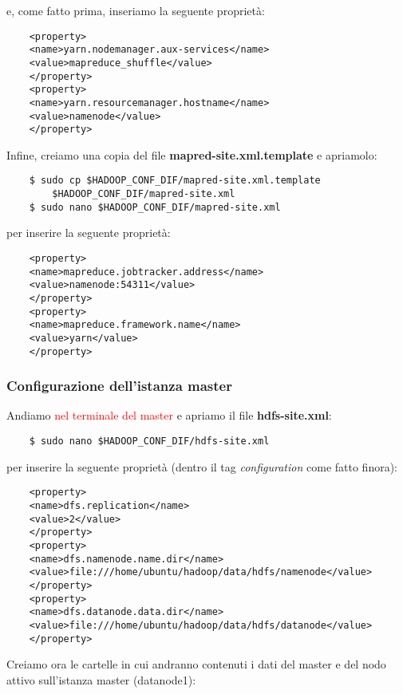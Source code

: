 e, come fatto prima, inseriamo la seguente proprietà:

\begin{verbatim}
    <property>
    <name>yarn.nodemanager.aux-services</name>
    <value>mapreduce_shuffle</value>
    </property>
    <property>
    <name>yarn.resourcemanager.hostname</name>
    <value>namenode</value>
    </property>
\end{verbatim}

Infine, creiamo una copia del file \textbf{mapred-site.xml.template} e apriamolo:

\begin{verbatim}
    $ sudo cp $HADOOP_CONF_DIF/mapred-site.xml.template
        $HADOOP_CONF_DIF/mapred-site.xml
    $ sudo nano $HADOOP_CONF_DIF/mapred-site.xml
\end{verbatim}

per inserire la seguente proprietà:

\begin{verbatim}
    <property>
    <name>mapreduce.jobtracker.address</name>
    <value>namenode:54311</value>
    </property>
    <property>
    <name>mapreduce.framework.name</name>
    <value>yarn</value>
    </property>
\end{verbatim}



\subsubsection{Configurazione dell'istanza master}

Andiamo \textcolor{red}{nel terminale del master} e apriamo il file \textbf{hdfs-site.xml}:

\begin{verbatim}
    $ sudo nano $HADOOP_CONF_DIF/hdfs-site.xml
\end{verbatim}

per inserire la seguente proprietà (dentro il tag \textit{configuration} come fatto finora):

\begin{verbatim}
    <property>
    <name>dfs.replication</name>
    <value>2</value>
    </property>
    <property>
    <name>dfs.namenode.name.dir</name>
    <value>file:///home/ubuntu/hadoop/data/hdfs/namenode</value>
    </property>
    <property>
    <name>dfs.datanode.data.dir</name>
    <value>file:///home/ubuntu/hadoop/data/hdfs/datanode</value>
    </property>
\end{verbatim}

Creiamo ora le cartelle in cui andranno contenuti i dati del master e del nodo attivo sull'istanza master (datanode1):

